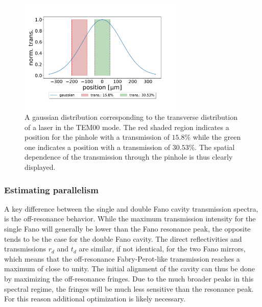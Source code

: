 \begin{figure}[h!]
    \centering
    \includegraphics[width=0.7\textwidth]{figures/pinhole_position_on_gaussian.pdf}
    \caption{A gaussian distribution corresponding to the transverse distribution of a laser in the TEM00 mode. The red shaded region indicates a position for the pinhole with a transmission of $15.8\%$ while the green one indicates a position with a transmission of $30.53\%$. The spatial dependence of the transmission through the pinhole is thus clearly displayed.}
    \label{fig:pinhole_position_on_gaussian}
\end{figure}

\subsubsection{Estimating parallelism}\label{sec:parallelism}

A key difference between the single and double Fano cavity transmission spectra, is the off-resonance behavior. While the maximum transmission intensity for the single Fano will generally be lower than the Fano resonance peak, the opposite tends to be the case for the double Fano cavity. The direct reflectivities and transmissions $r_d$ and $t_d$ are similar, if not identical, for the two Fano mirrors, which means that the off-resonance Fabry-Perot-like transmission reaches a maximum of close to unity. The initial alignment of the cavity can thus be done by maximizing the off-resonance fringes. Due to the much broader peaks in this spectral regime, the fringes will be much less sensitive than the resonance peak. For this reason additional optimization is likely necessary. 

